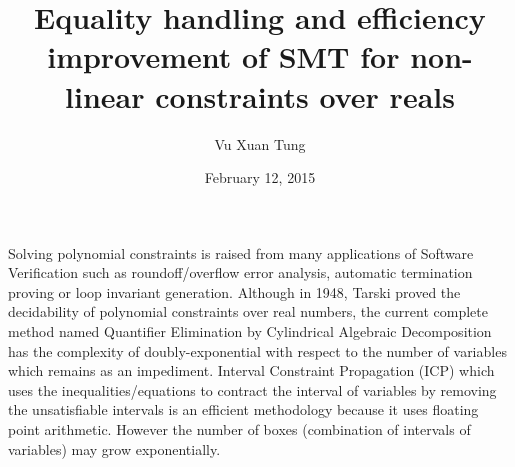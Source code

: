 \documentclass[12pt]{article}
\title{Equality handling and efficiency improvement of SMT for non-linear constraints over reals} %
\author{Vu Xuan Tung}{1310007}       %
\date{February 12, 2015}                %
\begin{document}
\maketitle
Solving polynomial constraints is raised from many applications of Software Verification such as roundoff/overflow error analysis, automatic termination proving or loop invariant generation. Although in 1948, Tarski proved the decidability of polynomial constraints over real numbers, the current complete method named Quantifier Elimination by Cylindrical Algebraic Decomposition has the complexity of doubly-exponential with respect to the number of variables which remains as an impediment. Interval Constraint Propagation (ICP) which uses the inequalities/equations to contract the interval of variables by removing the unsatisfiable intervals is an efficient methodology because it uses floating point arithmetic. However the number of boxes (combination of intervals of variables) may grow exponentially.
\end{document}
